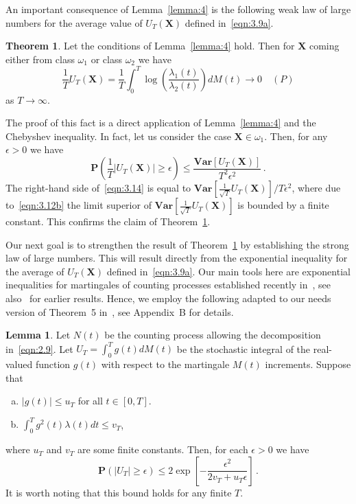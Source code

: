 \documentclass[lettersize,journal,onecolumn]{IEEEtran}
\theoremstyle{definition}
\newtheorem{theorem}{Theorem}
\newtheorem{lemma}{Lemma}
\newcommand{\Var}[1]{\mathbf{Var}\left[#1\right]}
\begin{document}
An important consequence of Lemma~\ref{lemma:4} is the following weak law of large 
numbers for the average value of $U_{T}(\mathbf{X})$ defined in~\eqref{eqn:3.9a}.
\begin{theorem}
	\label{theorem:1}
	Let the conditions of Lemma~\ref{lemma:4} hold. Then for $\mathbf{X}$ coming 
	either from class $\omega_{1}$ or class $\omega_{2}$ we have
	\begin{equation}
		\frac{1}{T}U_{T}(\mathbf{X}) =
		\frac{1}{T} \int_{0}^{T} \log\left(
		\frac{\lambda_{1}(t)}{\lambda_{2}(t)}
		\right) dM(t) \to 0
		\enspace\enspace
		(P)
		\label{eqn:3.13}
	\end{equation}
	as $T\to\infty$.
\end{theorem}
The proof of this fact is a direct application of Lemma~\ref{lemma:4} and the 
Chebyshev inequality. In fact, let us consider the case $\mathbf{X}\in\omega_{1}$. 
Then, for any $\epsilon>0$ we have
\begin{equation}
	\mathbf{P}\left(\frac{1}{T}\left|U_{T}(\mathbf{X})\right|\geq\epsilon\right) \leq
	\frac{\Var{U_{T}(\mathbf{X})}}{T^2\epsilon^2}
	\label{eqn:3.14}\,.
\end{equation}
The right-hand side of~\eqref{eqn:3.14} is equal to 
$\Var{\frac{1}{\sqrt{T}}U_{T}(\mathbf{X})}/T\epsilon^2$, where due to~\eqref{eqn:3.12b} 
the limit superior of $\Var{\frac{1}{\sqrt{T}}U_{T}(\mathbf{X})}$ is bounded by a finite
constant. This confirms the claim of Theorem~\ref{theorem:1}.

Our next goal is to strengthen the result of Theorem~\ref{theorem:1} by establishing 
the strong law of large numbers. This will result directly from the exponential 
inequality for the average of $U_{T}(\mathbf{X})$ defined in~\eqref{eqn:3.9a}. Our 
main tools here are exponential inequalities for martingales of counting processes 
established recently in~\cite{le2021exponential}, see also~\cite{van1995exponential} 
for earlier results. Hence, we employ the following adapted to our needs version 
of Theorem~5 in~\cite{le2021exponential}, see Appendix~B  for details.
\begin{lemma}
	\label{lemma:5}
	Let $N(t)$ be the counting process allowing the decomposition in~\eqref{eqn:2.9}. 
	Let $U_{T}=\int_{0}^{T}g(t)dM(t)$ be the stochastic integral of the real-valued 
	function $g(t)$ with respect to the martingale $M(t)$ increments. Suppose that
	\begin{enumerate}[(a)]
		\item $\left|g(t)\right| \leq u_{T}$ for all $t\in[0,T]$.
		\item $\int_{0}^{T}g^2(t)\lambda(t)dt \leq v_T$,
	\end{enumerate}
	where $u_T$ and $v_T$ are some finite constants. Then, for each $\epsilon>0$ we 
	have
	\begin{equation}
		\mathbf{P}\left(\left|U_{T}\right|\geq\epsilon\right) \leq
		2\exp\left[
		-\frac{\epsilon^2}{2v_{T}+u_{T}\epsilon}
		\right]
		\label{eqn:3.15}\,.
	\end{equation}
	It is worth noting that this bound holds for any finite $T$.
\end{lemma}
\end{document}
